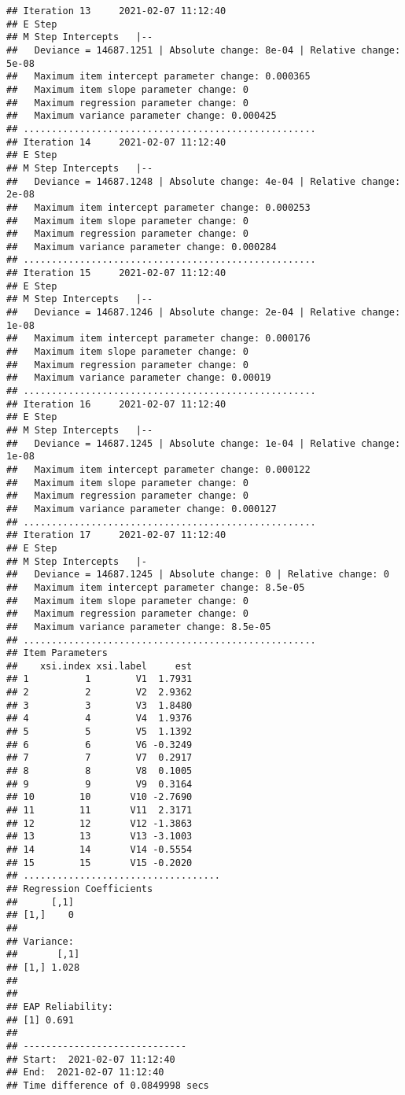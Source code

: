 \documentclass[
]{book}
\begin{document}
\begin{verbatim}
## Iteration 13     2021-02-07 11:12:40
## E Step
## M Step Intercepts   |--
##   Deviance = 14687.1251 | Absolute change: 8e-04 | Relative change: 5e-08
##   Maximum item intercept parameter change: 0.000365
##   Maximum item slope parameter change: 0
##   Maximum regression parameter change: 0
##   Maximum variance parameter change: 0.000425
## ....................................................
## Iteration 14     2021-02-07 11:12:40
## E Step
## M Step Intercepts   |--
##   Deviance = 14687.1248 | Absolute change: 4e-04 | Relative change: 2e-08
##   Maximum item intercept parameter change: 0.000253
##   Maximum item slope parameter change: 0
##   Maximum regression parameter change: 0
##   Maximum variance parameter change: 0.000284
## ....................................................
## Iteration 15     2021-02-07 11:12:40
## E Step
## M Step Intercepts   |--
##   Deviance = 14687.1246 | Absolute change: 2e-04 | Relative change: 1e-08
##   Maximum item intercept parameter change: 0.000176
##   Maximum item slope parameter change: 0
##   Maximum regression parameter change: 0
##   Maximum variance parameter change: 0.00019
## ....................................................
## Iteration 16     2021-02-07 11:12:40
## E Step
## M Step Intercepts   |--
##   Deviance = 14687.1245 | Absolute change: 1e-04 | Relative change: 1e-08
##   Maximum item intercept parameter change: 0.000122
##   Maximum item slope parameter change: 0
##   Maximum regression parameter change: 0
##   Maximum variance parameter change: 0.000127
## ....................................................
## Iteration 17     2021-02-07 11:12:40
## E Step
## M Step Intercepts   |-
##   Deviance = 14687.1245 | Absolute change: 0 | Relative change: 0
##   Maximum item intercept parameter change: 8.5e-05
##   Maximum item slope parameter change: 0
##   Maximum regression parameter change: 0
##   Maximum variance parameter change: 8.5e-05
## ....................................................
## Item Parameters
##    xsi.index xsi.label     est
## 1          1        V1  1.7931
## 2          2        V2  2.9362
## 3          3        V3  1.8480
## 4          4        V4  1.9376
## 5          5        V5  1.1392
## 6          6        V6 -0.3249
## 7          7        V7  0.2917
## 8          8        V8  0.1005
## 9          9        V9  0.3164
## 10        10       V10 -2.7690
## 11        11       V11  2.3171
## 12        12       V12 -1.3863
## 13        13       V13 -3.1003
## 14        14       V14 -0.5554
## 15        15       V15 -0.2020
## ...................................
## Regression Coefficients
##      [,1]
## [1,]    0
## 
## Variance:
##       [,1]
## [1,] 1.028
## 
## 
## EAP Reliability:
## [1] 0.691
## 
## -----------------------------
## Start:  2021-02-07 11:12:40
## End:  2021-02-07 11:12:40 
## Time difference of 0.0849998 secs
\end{verbatim}
\end{document}
